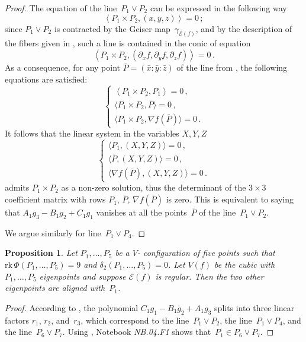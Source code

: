 \documentclass[a4paper, 11pt, reqno]{amsart}
\theoremstyle{plain}
\newtheorem{prop}[lemma]{Proposition}
\theoremstyle{definition}
\newcommand{\p}{\mathbb{P}}
\newcommand{\de}{\partial}
\newcommand{\nb}[2]{\textsl{{NB}.{#1}.{#2}}}
\newcommand{\rk}{\ensuremath{\mathrm{rk}}}
\newcommand{\Eig}[1]{\mathcal{E}\!\left( {#1} \right)}
\begin{document}
\begin{proof}
The equation of the line~$P_1 \vee P_2$ can be expressed in the following way
%
\begin{equation}
\label{eq:lineP1P2}
  \left\langle P_1 \times P_2, (x,y,z) \right\rangle = 0 \,;
\end{equation}
%
since $P_1 \vee P_2$ is contracted by the Geiser map~$\gamma_{\Eig{f}}$,
and by the description of the fibers given in , such a line is contained in the conic of equation
%
\[
  \left\langle P_1 \times P_2, (\de_x f, \de_y f, \de_z f) \right\rangle = 0 \,.
\]
%
As a consequence, for any point $\overline{P} = (\bar x: \bar y: \bar z)$ of the line from , the following equations are satisfied:
%
\[
  \left\{
  \begin{array}{l}
    \left\langle P_1 \times P_2, P_1 \right\rangle = 0 \,,\\[2pt]
    \bigl\langle P_1 \times P_2, \overline{P} \bigr\rangle = 0 \,,\\[2pt]
    \bigl\langle P_1 \times P_2, \nabla f (\overline{P}) \bigr\rangle = 0 \,.
  \end{array}
  \right.
\]
%
It follows that the linear system in the variables $X,Y,Z$
%
\[
  \left\{
  \begin{array}{l}
    \bigl\langle P_1, (X,Y,Z) \bigr\rangle = 0 \,,\\[2pt]
    \bigl\langle \overline{P}, (X,Y,Z) \bigr\rangle = 0 \,,\\[2pt]
    \bigl\langle \nabla f (\overline{P}),
    (X,Y,Z) \bigr\rangle = 0 \,.
  \end{array}
  \right.
\]
%
admits $P_1 \times P_2$ as a non-zero solution,
thus the determinant of the $3 \times 3$ coefficient matrix with rows
 $P_1$, $\overline{P}$, $\nabla f (\overline{P})$ is zero. This is equivalent to saying that $A_1 g_3 - B_1 g_2 + C_1 g_1$ vanishes at all the points~$\overline{P}$ of the line~$P_1 \vee P_2$.

We argue similarly for line~$P_1 \vee P_4$.
\end{proof}
%
\begin{prop}
\label{proposition:third_alignment}
Let $P_1, \dots, P_5$ be a $V$- configuration of five points such that  
$\rk\, \Phi(P_1, \dots, P_5) = 9$ and
$\delta_2(P_1, \dots, P_5) = 0$. Let $V(f)$ be
the cubic with $P_1, \dots, P_5$
eigenpoints and suppose $\Eig{f}$ is 
regular. Then the two other eigenpoints are aligned with~$P_1$.
\end{prop}
\begin{proof}
According to , the polynomial
$C_1g_1-B_1g_2+A_1g_3$ splits into three linear factors $r_1$, $r_2$, and~$r_3$, which
correspond to the line~$P_1 \vee P_2$, the line~$P_1 \vee P_4$, and the line~$P_6 \vee P_7$. Using , Notebook \nb{04}{F1} shows that~$P_1\in P_6 \vee P_7$.
\end{proof}
\end{document}
